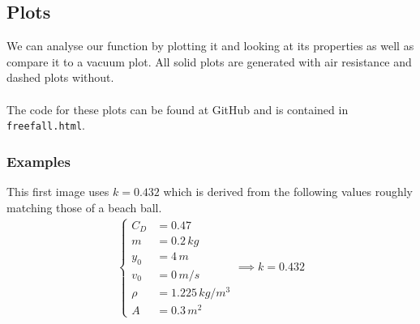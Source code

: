 \documentclass[%
aip,
jmp,
amsmath,amssymb,
reprint,%
]{revtex4-1}
\begin{document}
	\subsection{Plots}\label{seq:airResPlots}
	We can analyse our function by plotting it and looking at its properties as well as compare it to a vacuum plot. All solid plots are generated with air resistance and dashed plots without.
	\\~\\
	The code for these plots can be found at GitHub\cite{code} and is contained in \texttt{freefall.html}.
	\subsubsection{Examples}
	This first image uses $k = 0.432$ which is derived from the following values roughly matching those of a beach ball.
	\begin{align}
		\begin{cases}\nonumber
			C_D &= 0.47 \\
			m &= 0.2\,kg\\
			y_0 &= 4\,m\\
			v_0 &= 0\,m/s\\
			\rho &= 1.225\,kg/m^3\\
			A &= 0.3\,m^2
		\end{cases} \implies k = 0.432
	\end{align}
\end{document}
